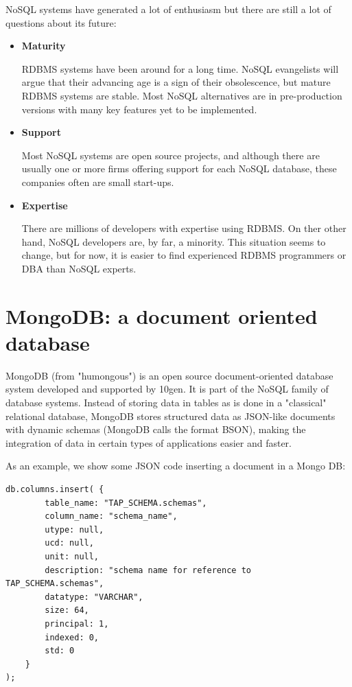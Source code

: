 NoSQL systems have generated a lot of enthusiasm but there are still a lot of questions about its future:

\begin{itemize}

\item \textbf{Maturity}

RDBMS systems have been around for a long time. NoSQL evangelists will argue that their advancing age is a sign of their obsolescence, but mature RDBMS systems are stable. Most NoSQL alternatives are in pre-production versions with many key features yet to be implemented.

\item \textbf{Support}

Most NoSQL systems are open source projects, and although there are usually one or more firms offering support for each NoSQL database, these companies often are small start-ups.

\item \textbf{Expertise}

There are millions of developers with expertise using RDBMS. On ther other hand, NoSQL developers are, by far, a minority. This situation seems to change, but for now, it is easier to find experienced RDBMS programmers or DBA than NoSQL experts.

\end{itemize}

\section{MongoDB: a document oriented database}

MongoDB (from "humongous") is an open source document-oriented database system developed and supported by 10gen. It is part of the NoSQL family of database systems. Instead of storing data in tables as is done in a "classical" relational database, MongoDB stores structured data as JSON-like documents with dynamic schemas (MongoDB calls the format BSON), making the integration of data in certain types of applications easier and faster. \newline

As an example, we show some JSON code inserting a document in a Mongo DB:
\begin{lstlisting}
db.columns.insert( {
		table_name: "TAP_SCHEMA.schemas",
		column_name: "schema_name",
		utype: null,
		ucd: null,
		unit: null,
		description: "schema name for reference to TAP_SCHEMA.schemas",
		datatype: "VARCHAR",
		size: 64,
		principal: 1,
		indexed: 0,
		std: 0
	}
);
\end{lstlisting} 


